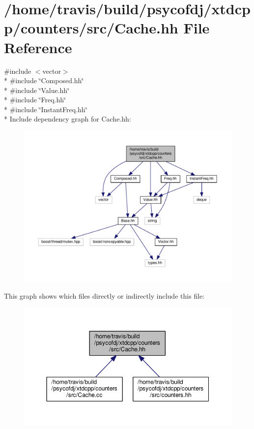 \hypertarget{Cache_8hh}{\section{/home/travis/build/psycofdj/xtdcpp/counters/src/\-Cache.hh File Reference}
\label{Cache_8hh}
}
{\ttfamily \#include $<$vector$>$}\\*
{\ttfamily \#include \char`\"{}Composed.\-hh\char`\"{}}\\*
{\ttfamily \#include \char`\"{}Value.\-hh\char`\"{}}\\*
{\ttfamily \#include \char`\"{}Freq.\-hh\char`\"{}}\\*
{\ttfamily \#include \char`\"{}Instant\-Freq.\-hh\char`\"{}}\\*
Include dependency graph for Cache.\-hh\-:
\nopagebreak
\begin{figure}[H]
\begin{center}
\leavevmode
\includegraphics[width=350pt]{Cache_8hh__incl}
\end{center}
\end{figure}
This graph shows which files directly or indirectly include this file\-:
\nopagebreak
\begin{figure}[H]
\begin{center}
\leavevmode
\includegraphics[width=350pt]{Cache_8hh__dep__incl}
\end{center}
\end{figure}
